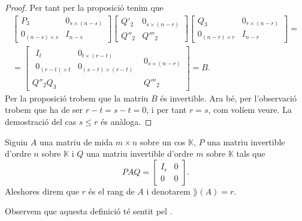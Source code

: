 \documentclass[../Apunts.tex]{subfiles}
\begin{document}
\begin{theorem}
\begin{proof}
			Per tant per la proposició  tenim que
			\begin{multline*}
			\left[\begin{array}{c|c}
			P_{3} & 0_{s\times(n-s)} \\\hline
			0_{(n-s)\times s} & I_{n-s}
			\end{array}\right]
			\left[\begin{array}{c|c}
			Q'_{2} & 0_{s\times(n-r)} \\\hline
			Q''_{2} & Q'''_{2}
			\end{array}\right]
			\left[\begin{array}{c|c}
			Q_{3} & 0_{r\times(n-r)} \\\hline
			0_{(n-r)\times r} & I_{n-r}
			\end{array}\right]=\\=
			\left[\begin{array}{c|c}
				\begin{array}{c|c}
				I_{t} & 0_{t\times(r-t)} \\\hline
				0_{(r-t)\times t} & 0_{(s-t)\times(r-t)}
				\end{array}
			& 0_{s\times(n-r)} \\\hline
			Q''_{2}Q_{3} & Q'''_{2}
			\end{array}\right]=B.
			\end{multline*}
			Per la proposició  trobem que la matriu \(B\) és invertible. Ara bé, per l'observació  trobem que ha de ser \(r-t=s-t=0\), i per tant \(r=s\), com volíem veure. La demostració del cas \(s\leq r\) és anàloga.
		\end{proof}
	\end{theorem}
	\begin{definition}[Rang]
		\label{def:rang d'una matriu}
		Siguin \(A\) una matriu de mida \(m\times n\) sobre un cos \(\mathbb{K}\), \(P\) una matriu invertible d'ordre \(n\) sobre \(\mathbb{K}\) i \(Q\) una matriu invertible d'ordre \(m\) sobre \(\mathbb{K}\) tals que
		\[PAQ=\left[\begin{array}{c|c}
		I_{r} & 0 \\\hline
		0 & 0
		\end{array}\right].\]
		Aleshores direm que \(r\) és el rang de \(A\) i denotarem \(\rang(A)=r\).
		
		Observem que aquesta definició té sentit pel .
	\end{definition}
\end{document}
